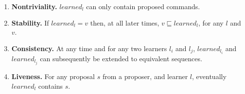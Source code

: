 \begin{enumerate}
	\item \textbf{Nontriviality.} $learned_l$ can only contain proposed commands. 
	\item \textbf{Stability.} If $learned_l = v$ then, at all later times, $v \sqsubseteq learned_l$, for any $l$ and $v$. 
	\item \textbf{Consistency.}  At any time and for any two learners $l_i$ and $l_j$, $learned_{l_i}$ and $learned_{l_j}$ can subsequently be extended to equivalent sequences.
	\item \textbf{Liveness.} For any proposal $s$ from a proposer, and learner $l$, eventually $learned_l$ contains $s$.
\end{enumerate}
